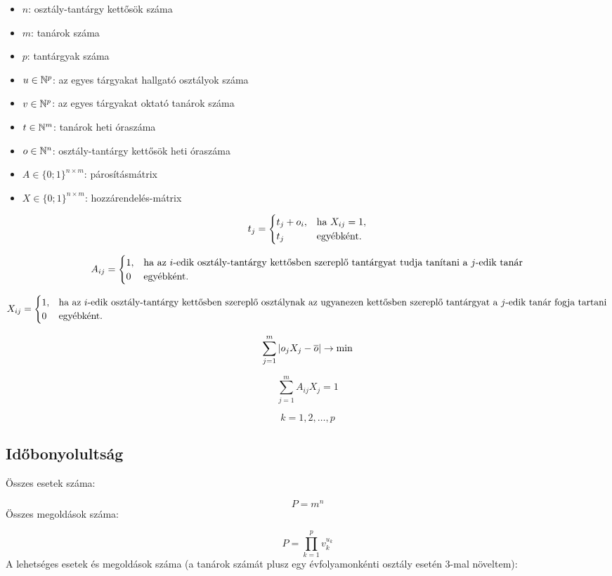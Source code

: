 \documentclass[12pt,a4paper]{report}
\begin{document}
\begin{itemize}
    \item $n$: osztály-tantárgy kettősök száma
    \item $m$: tanárok száma
    \item $p$: tantárgyak száma
    \item $u \in \Bbb{N}^p$: az egyes tárgyakat hallgató osztályok száma
    \item $v \in \Bbb{N}^p$: az egyes tárgyakat oktató tanárok száma
    \item $t \in \Bbb{N}^m$: tanárok heti óraszáma
    \item $o \in \Bbb{N}^n$: osztály-tantárgy kettősök heti óraszáma
    \item $A \in \{0;1\}^{n \times m}$: párosításmátrix
    \item $X \in \{0;1\}^{n \times m}$: hozzárendelés-mátrix
\end{itemize}

\[
t_{j} =
\begin{cases}
t_j+o_i,& \hbox{ha } X_{ij}=1, \\
t_j & \hbox{egyébként}.
\end{cases}
\]

\[
A_{ij} =
\begin{cases}
1, & \hbox{ha az $i$-edik osztály-tantárgy kettősben szereplő tantárgyat tudja tanítani a $j$-edik tanár} \\
0 & \hbox{egyébként}.
\end{cases}
\]

\[
X_{ij} =
\begin{cases}
1, & \hbox{ha az $i$-edik osztály-tantárgy kettősben szereplő osztálynak az ugyanezen kettősben szereplő tantárgyat a $j$-edik tanár fogja tartani} \\
0 & \hbox{egyébként}.
\end{cases}
\]

$$\sum_{j=1}^m \vert o_jX_j-\overline{o}\vert \rightarrow \hbox{min}$$

$$\sum_{j=1}^m A_{ij} X_j=1$$

$$k=1, 2, \ldots, p$$

\subsection{Időbonyolultság}

Összes esetek száma:

$$P=m^n$$
Összes megoldások száma:

$$P=\prod_{k=1}^p v_k^{u_k}$$
A lehetséges esetek és megoldások száma (a tanárok számát plusz egy évfolyamonkénti osztály esetén 3-mal növeltem):
\end{document}
